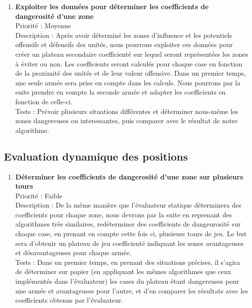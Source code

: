 \begin{enumerate}
				\item \textbf{Exploiter les données pour déterminer les coefficients de dangerosité d'une zone} 
				\\[0.7\baselineskip]
				Priorité : Moyenne 
				\\[0.7\baselineskip]
				Description : Après avoir déterminé les zones d'influence et les potentiels offensifs et défensifs des unités, nous pourrons exploiter ces données pour 
				créer un plateau secondaire coefficienté sur lequel seront représentées les zones à éviter ou non. Les coefficients seront calculés pour chaque case en 
				fonction de la proximité des unités et de leur valeur offensive. Dans un premier temps, une seule armée sera prise en compte dans les calculs. Nous pourrons 
				par la suite prendre en compte la seconde armée et adapter les coefficients en fonction de celle-ci. 
				\\[0.7\baselineskip]
				Tests : Prévoir plusieurs situations différentes et déterminer nous-même les zones dangereuses ou interessantes, puis comparer 
				avec le résultat de notre algorithme. 
				\\[0.7\baselineskip]
				
			\end{enumerate}

		\subsection{Evaluation dynamique des positions}

			\begin{enumerate}

				\item \textbf{Déterminer les coefficients de dangerosité d'une zone sur plusieurs tours} 
				\\[0.7\baselineskip]
				Priorité : Faible 
				\\[0.7\baselineskip]
				Description : De la même manière que l'évaluateur statique déterminera des coefficients pour chaque zone, nous devrons par la suite en reprenant des 
				algorithmes très similaires, redéterminer des coefficients de dangeurosité sur chaque case, en prenant en compte cette fois ci, plusieurs tours de jeu. 
				Le but sera d'obtenir un plateau de jeu coefficienté indiquant les zones avantageuses et désavantageuses pour chaque armée. 
				\\[0.7\baselineskip]
				Tests : Dans un premier temps, en prenant des situations précises, il s'agira de déterminer sur papier (en appliquant les mêmes algorithmes que ceux 
				implémentés dans l'évaluateur) les cases du plateau étant dangereuses pour une armée et avantageuses pour l'autre, et d'en comparer les résultats avec 
				les coefficients obtenus par l'évaluateur. 
				\\[0.7\baselineskip]
				
			\end{enumerate}

